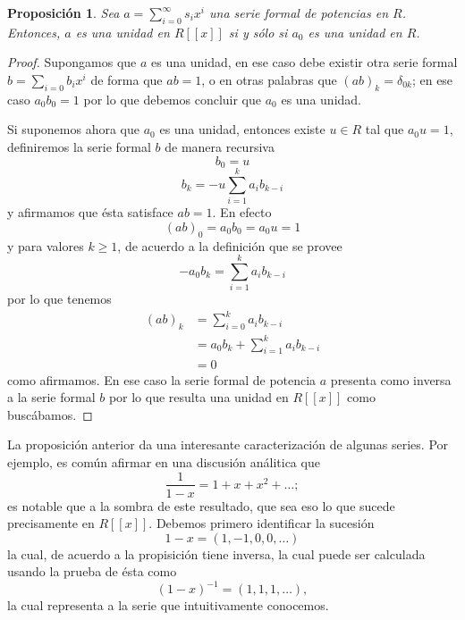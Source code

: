 \documentclass[letter,10pt,notitlepage]{article}
\newtheorem{proposition}{Proposición}
\theoremstyle{definition}
\theoremstyle{remark}
\begin{document}
\begin{proposition}
  Sea \( a = \sum_{i=0}^{\infty}s_ix^i\) una serie 
  formal de potencias en \( R\). Entonces, \( a\) es una 
  unidad en \( R\left[[x]\right]\) si y sólo si \( a_0\) es 
  una unidad en \( R\).
\end{proposition}
\begin{proof}
  Supongamos que \( a\) es una unidad, en ese caso debe existir 
  otra serie formal \( b = \sum_{i=0}b_ix^i \) de forma 
  que \( ab = 1\), o en otras palabras que 
  \( (a b)_k = \delta_{0k}\); en ese caso \( a_0 b_0 = 1\) por 
  lo que debemos concluir que \( a_0\) es una unidad.

  Si suponemos ahora que \( a_0\) es una unidad, entonces 
  existe \( u \in R\) tal que \( a_0 u= 1\),  definiremos la 
  serie formal  \( b\) de manera recursiva  
  \[ b_0 = u\]
  \[ b_{k} = -u \sum_{i=1}^{k}a_ib_{k-i} \]
  y afirmamos que ésta satisface \( a b = 1 \). En efecto
  \[ (ab)_0 = a_0b_0 = a_0u = 1\] 
  y para valores \( k\geq 1\), 
  de acuerdo a la definición que se provee 
  \[  -a_0b_k = \sum_{i=1}^{k}a_ib_{k-i} \]
  por lo que tenemos 
  \begin{align*}
    (ab)_k &= \sum_{i=0}^{k}a_{i}b_{k-i} \\
    	& = a_0b_k+ \sum_{i=1}^{k}a_{i}b_{k-i} \\
	& = 0
  \end{align*}
  como afirmamos. En ese caso la serie formal de potencia 
  \( a\) presenta como inversa a la serie formal \( b\) por 
  lo que resulta una unidad en \( R\left[[x]\right]\)
  como buscábamos.
\end{proof} 

La proposición anterior da una interesante caracterización
de algunas series. Por ejemplo, es común afirmar en una
discusión análitica que
\[ \frac{1}{1-x} = 1 + x + x^2 + \dots;\]
es notable que a la sombra de este resultado, que sea
eso lo que sucede precisamente en \( R\left[ [x] \right]\).
Debemos primero identificar la sucesión
\[ 1 - x = (1,-1,0,0,\dots)\]
la cual, de acuerdo a la propisición tiene inversa, la
cual puede ser calculada usando la prueba de ésta como
\[ (1-x)^{-1} = (1, 1, 1, \dots),\]
la cual representa a la serie que intuitivamente conocemos.
\end{document}

